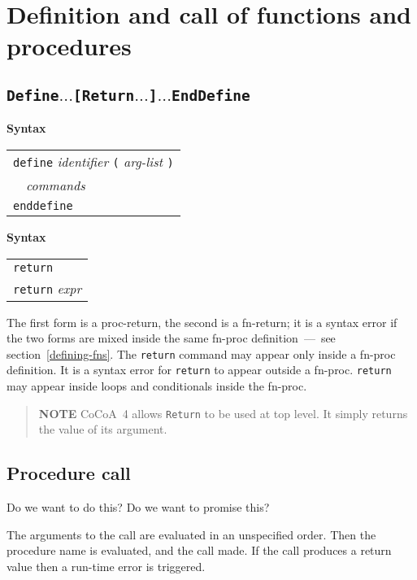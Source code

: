 \documentclass{book}[12,a4paper]
\def\mydots{$...$}
\newenvironment{syntax}
{\goodbreak\noindent\textbf{Syntax}\\
 \begin{tabular}{|p{0.9\textwidth}|}\hline}
{\\\hline\end{tabular}}
\begin{document}
\section{Definition and call of functions and procedures}
\label{command:fun-proc}

\subsection{\texttt{Define\mydots [Return\mydots]\mydots EndDefine}}
\label{keyword:define}

\begin{syntax}
\texttt{define} \textit{identifier} \texttt{(} \textit{arg-list} \texttt{)}\\
\ \ \textit{commands}\\
\texttt{enddefine}
\end{syntax}

\begin{syntax}
\texttt{return}\\
\texttt{return} \textit{expr}
\end{syntax}

The first form is a proc-return, the second is a fn-return; it is a syntax
error if the two forms are mixed inside the same fn-proc definition~---~see section~\ref{defining-fns}.
The \texttt{return} command may appear only inside a fn-proc definition.
It is a syntax error for \texttt{return} to appear outside a fn-proc.
\texttt{return} may appear inside loops and conditionals inside the fn-proc.

\begin{quote}
  {\bf NOTE} CoCoA~4 allows \texttt{Return} to be used at top level.  It
  simply returns the value of its argument.  
\end{quote}

\subsection{Procedure call}

Do we want to do this?  Do we want to promise this?

The arguments to the call are evaluated in an unspecified order.  Then the
procedure name is evaluated, and the call made.  If the call produces a return
value then a run-time error is triggered.
\end{document}
